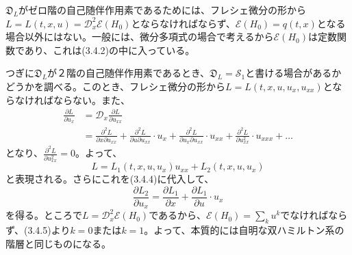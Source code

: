 \documentclass[a4paper, 11pt]{report}
\theoremstyle{definition}
\begin{document}
 $\mathfrak{D}_L$がゼロ階の自己随伴作用素であるためには、フレシェ微分の形から$L=L(t,x,u)=\mathcal{D}_x^2\mathcal{E}(H_0)$とならなければならず、$\mathcal{E}(H_0)=q(t,x)$となる場合以外にはない。一般には、微分多項式の場合で考えるから$\mathcal{E}(H_0)$は定数関数であり、これは(3.4.2)の中に入っている。

 つぎに$\mathfrak{D}_L$が２階の自己随伴作用素であるとき、$\mathfrak{D}_L=\mathcal{S}_1$と書ける場合があるかどうかを調べる。このとき、フレシェ微分の形から$L=L(t,x,u,u_x,u_{xx})$とならなければならない。また、
\begin{align}
\frac{\partial L}{\partial u_x} &= \mathcal{D}_x\frac{\partial L}{\partial u_{xx}}\nonumber\\
&= \frac{{\partial}^2 L}{\partial x\partial u_{xx}} + \frac{{\partial}^2 L}{\partial u\partial u_{xx}}\cdot u_x + \frac{{\partial}^2 L}{\partial u_x\partial u_{xx}}\cdot u_{xx} + \frac{{\partial}^2 L}{\partial u_{xx}^2}\cdot u_{xxx} + \dots  %
\end{align}
となり、$\frac{{\partial}^2 L}{\partial u_{xx}^2}=0$。よって、
\begin{equation*}
L = L_1(t,x,u,u_x)u_{xx} + L_2(t,x,u,u_x)
\end{equation*}
と表現される。さらにこれを(3.4.4)に代入して、
\begin{equation}
\frac{\partial L_2}{\partial u_x} = \frac{\partial L_1}{\partial x}+\frac{\partial L_1}{\partial u}\cdot u_x  %
\end{equation}
を得る。ところで$L=\mathcal{D}_x^2\mathcal{E}(H_0)$であるから、$\mathcal{E}(H_0)=\sum_ku^k$でなければならず、(3.4.5)より$k=0$または$k=1$。よって、本質的には自明な双ハミルトン系の階層と同じものになる。
\end{document}
